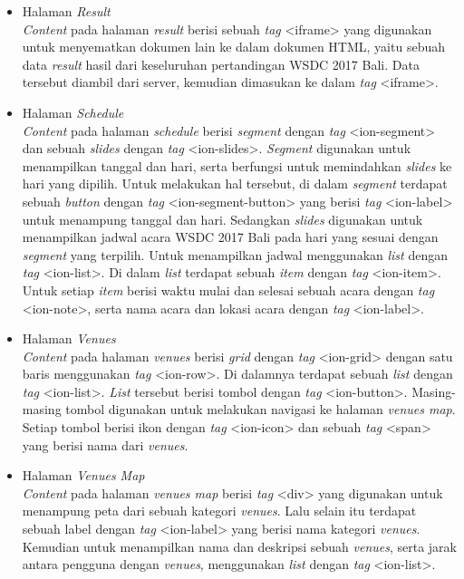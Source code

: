 \begin{enumerate}
\begin{itemize}
				\item Halaman \textit{Result}\\
					\textit{Content} pada halaman \textit{result} berisi sebuah \textit{tag} <iframe> yang digunakan untuk menyematkan dokumen lain ke dalam dokumen HTML, yaitu sebuah data \textit{result} hasil dari keseluruhan pertandingan WSDC 2017 Bali. Data tersebut diambil dari server, kemudian dimasukan ke dalam \textit{tag} <iframe>. 
					
				\item Halaman \textit{Schedule} \\
					\textit{Content} pada halaman \textit{schedule} berisi \textit{segment} dengan \textit{tag} <ion-segment> dan sebuah \textit{slides} dengan \textit{tag} <ion-slides>. \textit{Segment} digunakan untuk menampilkan tanggal dan hari, serta berfungsi untuk memindahkan \textit{slides} ke hari yang dipilih. Untuk melakukan hal tersebut, di dalam \textit{segment} terdapat sebuah \textit{button} dengan \textit{tag} <ion-segment-button> yang berisi \textit{tag} <ion-label> untuk menampung tanggal dan hari. 
					Sedangkan \textit{slides} digunakan untuk menampilkan jadwal acara WSDC 2017 Bali pada hari yang sesuai dengan \textit{segment} yang terpilih. Untuk menampilkan jadwal menggunakan \textit{list} dengan \textit{tag} <ion-list>. Di dalam \textit{list} terdapat sebuah \textit{item} dengan \textit{tag} <ion-item>. Untuk setiap \textit{item} berisi waktu mulai dan selesai sebuah acara dengan \textit{tag} <ion-note>, serta nama acara dan lokasi acara dengan \textit{tag}  <ion-label>.
					
				\item Halaman \textit{Venues} \\
					\textit{Content} pada halaman \textit{venues} berisi \textit{grid} dengan \textit{tag} <ion-grid> dengan satu baris menggunakan \textit{tag} <ion-row>. Di dalamnya terdapat sebuah \textit{list} dengan \textit{tag} <ion-list>. \textit{List} tersebut berisi tombol dengan \textit{tag} <ion-button>. Masing-masing tombol digunakan untuk melakukan navigasi ke halaman \textit{venues map}. Setiap tombol berisi ikon dengan \textit{tag} <ion-icon> dan sebuah \textit{tag} <span> yang berisi nama dari \textit{venues}.
					
				\item Halaman \textit{Venues Map} \\
					\textit{Content} pada halaman \textit{venues map} berisi \textit{tag} <div> yang digunakan untuk menampung peta dari sebuah kategori \textit{venues}. Lalu selain itu terdapat sebuah label dengan \textit{tag} <ion-label> yang berisi nama kategori \textit{venues}. Kemudian untuk menampilkan nama dan deskripsi sebuah \textit{venues}, serta jarak antara pengguna dengan \textit{venues}, menggunakan \textit{list} dengan \textit{tag} <ion-list>.
				
			\end{itemize}			  
	\end{enumerate}